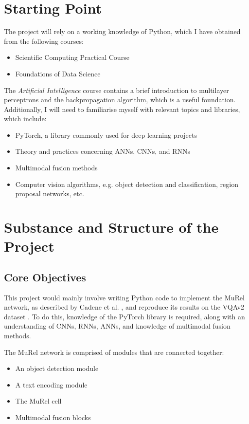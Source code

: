 \documentclass[12pt]{article}
\begin{document}
\section*{Starting Point}

The project will rely on a working knowledge of Python, which I have obtained from the following courses:

\begin{itemize}
	\item Scientific Computing Practical Course
	\item Foundations of Data Science
\end{itemize}

The \textit{Artificial Intelligence} course contains a brief introduction to multilayer perceptrons and the backpropagation algorithm, which is a useful foundation. Additionally, I will need to familiarise myself with relevant topics and libraries, which include:

\begin{itemize}
	\item PyTorch, a library commonly used for deep learning projects
	\item Theory and practices concerning ANNs, CNNs, and RNNs
	\item Multimodal fusion methods
	\item Computer vision algorithms, e.g. object detection and classification, region proposal networks, etc.
\end{itemize}

\section*{Substance and Structure of the Project}

\subsection*{Core Objectives}
This project would mainly involve writing Python code to implement the MuRel network, as described by Cadene et al. \cite{murel}, and reproduce its results on the VQAv2 dataset \cite{vqav2}. To do this, knowledge of the PyTorch library is required, along with an understanding of CNNs, RNNs, ANNs, and knowledge of multimodal fusion methods. 

The MuRel network is comprised of modules that are connected together:

\begin{itemize}
	\item An object detection module
	\item A text encoding module
	\item The MuRel cell
	\item Multimodal fusion blocks
\end{itemize}
\end{document}
